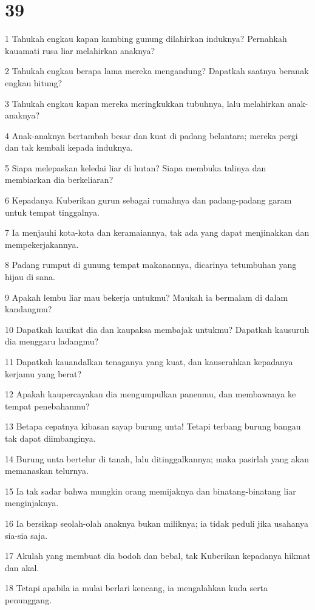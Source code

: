 \chapter{39}

\par 1 Tahukah engkau kapan kambing gunung dilahirkan induknya? Pernahkah kauamati rusa liar melahirkan anaknya?
\par 2 Tahukah engkau berapa lama mereka mengandung? Dapatkah saatnya beranak engkau hitung?
\par 3 Tahukah engkau kapan mereka meringkukkan tubuhnya, lalu melahirkan anak-anaknya?
\par 4 Anak-anaknya bertambah besar dan kuat di padang belantara; mereka pergi dan tak kembali kepada induknya.
\par 5 Siapa melepaskan keledai liar di hutan? Siapa membuka talinya dan membiarkan dia berkeliaran?
\par 6 Kepadanya Kuberikan gurun sebagai rumahnya dan padang-padang garam untuk tempat tinggalnya.
\par 7 Ia menjauhi kota-kota dan keramaiannya, tak ada yang dapat menjinakkan dan mempekerjakannya.
\par 8 Padang rumput di gunung tempat makanannya, dicarinya tetumbuhan yang hijau di sana.
\par 9 Apakah lembu liar mau bekerja untukmu? Maukah ia bermalam di dalam kandangmu?
\par 10 Dapatkah kauikat dia dan kaupaksa membajak untukmu? Dapatkah kausuruh dia menggaru ladangmu?
\par 11 Dapatkah kauandalkan tenaganya yang kuat, dan kauserahkan kepadanya kerjamu yang berat?
\par 12 Apakah kaupercayakan dia mengumpulkan panenmu, dan membawanya ke tempat penebahanmu?
\par 13 Betapa cepatnya kibasan sayap burung unta! Tetapi terbang burung bangau tak dapat diimbanginya.
\par 14 Burung unta bertelur di tanah, lalu ditinggalkannya; maka pasirlah yang akan memanaskan telurnya.
\par 15 Ia tak sadar bahwa mungkin orang memijaknya dan binatang-binatang liar menginjaknya.
\par 16 Ia bersikap seolah-olah anaknya bukan miliknya; ia tidak peduli jika usahanya sia-sia saja.
\par 17 Akulah yang membuat dia bodoh dan bebal, tak Kuberikan kepadanya hikmat dan akal.
\par 18 Tetapi apabila ia mulai berlari kencang, ia mengalahkan kuda serta penunggang.
